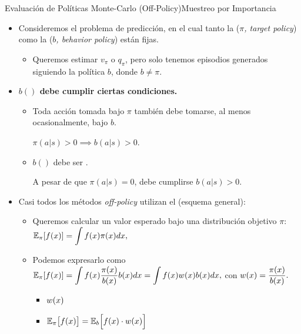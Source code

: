\documentclass[10pt, envcountsect, handout, aspectratio=1610, hyperref={hypertexnames=true}]{beamer}
\begin{document}
\begin{frame}{Evaluación de Políticas Monte-Carlo (Off-Policy)}{Muestreo por Importancia}		
	\begin{itemize}
		\item Consideremos el problema de predicción, en el cual tanto la  (\textit{$\pi$, target policy}) como la  (\textit{$b$, behavior policy}) están fijas.
		\begin{itemize}
			\item Queremos estimar \( v_\pi \) o \( q_\pi \), pero solo tenemos episodios generados siguiendo la política \( b \), donde \( b \neq \pi \).
		\end{itemize}
		
		\item \textbf{$b()$ debe cumplir ciertas condiciones.}
		
			\begin{itemize}
				\item {} Toda acción tomada bajo \( \pi \) también debe tomarse, al menos ocasionalmente, bajo \( b \). 
				
						\hfil {\large $\pi(a|s) > 0 \implies b(a|s) > 0.$}
		
				\item \( b() \) debe ser .
				
				\hfil A pesar de que $\pi(a|s) = 0$, debe cumplirse $b(a|s) > 0.$
			\end{itemize}
		
		\item Casi todos los métodos \textit{off-policy} utilizan el  (esquema general):
		
			\begin{itemize}
				\item Queremos calcular un valor esperado bajo una distribución objetivo \( \pi \):
				$\displaystyle
				\mathbb{E}_\pi[f(x)] = \int f(x) \pi(x) dx,
				$
				
				\item Podemos expresarlo como 
				$\displaystyle
				\mathbb{E}_\pi[f(x)] = \int f(x) \frac{\pi(x)}{b(x)} b(x) dx = \int f(x) w(x) b(x) dx,
				$
				con $\displaystyle w(x) = \frac{\pi(x)}{b(x)}.$
				
				\begin{itemize}
					\item {} $\displaystyle w(x)$
					\item $\displaystyle \mathbb{E}_\pi \big[ f(x) \big] =  \mathbb{E}_{b} \Big[ f(x)\cdot w(x) \Big]$
				\end{itemize}
				

\end{itemize}
\end{itemize}
\end{frame}
\end{document}
